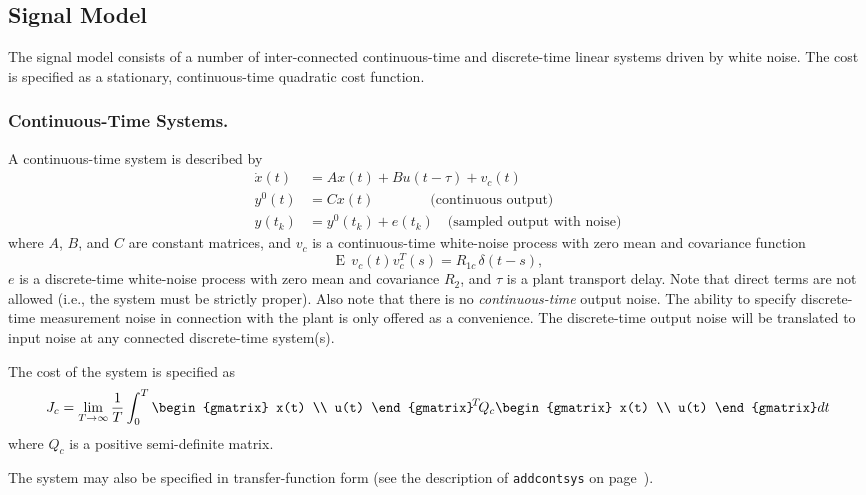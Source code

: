 \documentclass[final,twoside]{rapport}  %
\DeclareMathOperator{\E}{E}
\begin{document}
\subsection{Signal Model}

The signal model consists of a number of inter-connected
continuous-time and discrete-time linear systems driven by white
noise. The cost is specified as a stationary, continuous-time
quadratic cost function.

\subsubsection{Continuous-Time Systems.}
A continuous-time system is described by
\[
\begin{aligned}
\dot x(t) &= A x(t) + B u(t-\tau) + v_c(t) \\
y^0(t) &= C x(t) \qquad\qquad  \text{(continuous output)} \\
y(t_k) &= y^0(t_k) + e(t_k) \quad \text{(sampled output with noise)}
\end{aligned}
\]
where $A$, $B$, and $C$ are constant matrices, and $v_c$ is a
continuous-time white-noise process with zero mean and covariance function
\[
\E \, v_c(t)v_c^T\!(s) = R_{1c} \, \delta(t-s),
\]
$e$ is a discrete-time
white-noise process with zero mean and covariance $R_2$, and
$\tau$ is a plant transport delay. Note that direct terms are not allowed
(i.e., the system must be strictly proper). Also note that there is no
{\em continuous-time} output noise. The ability to specify
discrete-time measurement noise in connection with the plant is only
offered as a convenience. The discrete-time output noise will be
translated to input noise at any connected discrete-time system(s).

The cost of the system is specified as
\[
J_c = \lim_{T \rightarrow \infty} \frac{1}{T} \int_0^T
  \begin{gmatrix} x(t) \\ u(t) \end{gmatrix}^{\!T} \! Q_c
  \begin{gmatrix} x(t) \\ u(t) \end{gmatrix} dt
\]
where $Q_c$ is a positive semi-definite matrix.

The system may also be specified in transfer-function form (see the
description of {\tt addcontsys} on page~\pageref{sec:addcontsys}).
\end{document}
